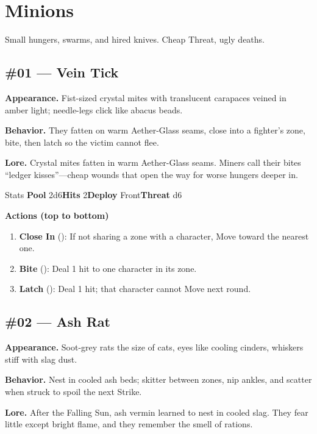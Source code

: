 \section{Minions}

Small hungers, swarms, and hired knives. Cheap Threat, ugly deaths.

\subsection*{\#01 --- Vein Tick}

\textbf{Appearance.} Fist-sized crystal mites with translucent carapaces veined in amber light; needle-legs click like abacus beads.

\textbf{Behavior.} They fatten on warm Aether-Glass seams, close into a fighter's zone, bite, then latch so the victim cannot flee.

\textbf{Lore.} Crystal mites fatten in warm Aether-Glass seams. Miners call their bites ``ledger kisses''---cheap wounds that open the way for worse hungers deeper in.

\begin{monsterentry}{Stats}
\textbf{Pool} 2d6\quad\textbf{Hits} 2\quad\textbf{Deploy} Front\quad\textbf{Threat} d6

\textbf{Actions (top to bottom)}
\begin{enumerate}\setlength{\itemsep}{0.15em}\setlength{\parskip}{0pt}
  \item \textbf{Close In} (\easy): If not sharing a zone with a character, Move toward the nearest one.
  \item \textbf{Bite} (\medium): Deal 1 hit to one character in its zone.
  \item \textbf{Latch} (\hard): Deal 1 hit; that character cannot Move next round.
\end{enumerate}
\end{monsterentry}

\subsection*{\#02 --- Ash Rat}

\textbf{Appearance.} Soot-grey rats the size of cats, eyes like cooling cinders, whiskers stiff with slag dust.

\textbf{Behavior.} Nest in cooled ash beds; skitter between zones, nip ankles, and scatter when struck to spoil the next Strike.

\textbf{Lore.} After the Falling Sun, ash vermin learned to nest in cooled slag. They fear little except bright flame, and they remember the smell of rations.

